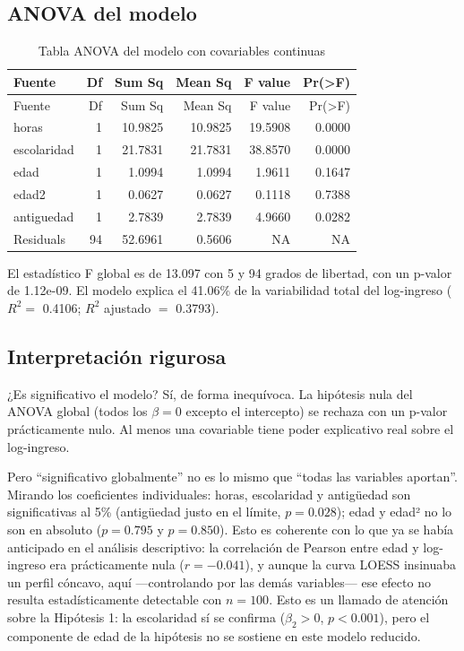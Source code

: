 \documentclass[
  spanish,
  letterpaper,
  DIV=11,
  numbers=noendperiod]{scrartcl}
\begin{document}
\subsection{ANOVA del modelo}\label{anova-del-modelo}

\begin{longtable}[]{@{}lrrrrr@{}}
\caption{Tabla ANOVA del modelo con covariables
continuas}\tabularnewline
\toprule\noalign{}
Fuente & Df & Sum Sq & Mean Sq & F value & Pr(\textgreater F) \\
\midrule\noalign{}
\endfirsthead
\toprule\noalign{}
Fuente & Df & Sum Sq & Mean Sq & F value & Pr(\textgreater F) \\
\midrule\noalign{}
\endhead
\bottomrule\noalign{}
\endlastfoot
horas & 1 & 10.9825 & 10.9825 & 19.5908 & 0.0000 \\
escolaridad & 1 & 21.7831 & 21.7831 & 38.8570 & 0.0000 \\
edad & 1 & 1.0994 & 1.0994 & 1.9611 & 0.1647 \\
edad2 & 1 & 0.0627 & 0.0627 & 0.1118 & 0.7388 \\
antiguedad & 1 & 2.7839 & 2.7839 & 4.9660 & 0.0282 \\
Residuals & 94 & 52.6961 & 0.5606 & NA & NA \\
\end{longtable}

El estadístico F global es de 13.097 con 5 y 94 grados de libertad, con
un p-valor de 1.12e-09. El modelo explica el 41.06\% de la variabilidad
total del log-ingreso (\(R^2=\) 0.4106; \(R^2\) ajustado \(=\) 0.3793).

\subsection{Interpretación rigurosa}\label{interpretaciuxf3n-rigurosa}

¿Es significativo el modelo? Sí, de forma inequívoca. La hipótesis nula
del ANOVA global (todos los \(\beta=0\) excepto el intercepto) se
rechaza con un p-valor prácticamente nulo. Al menos una covariable tiene
poder explicativo real sobre el log-ingreso.

Pero ``significativo globalmente'' no es lo mismo que ``todas las
variables aportan''. Mirando los coeficientes individuales: horas,
escolaridad y antigüedad son significativas al 5\% (antigüedad justo en
el límite, \(p=0.028\)); edad y edad² no lo son en absoluto (\(p=0.795\)
y \(p=0.850\)). Esto es coherente con lo que ya se había anticipado en
el análisis descriptivo: la correlación de Pearson entre edad y
log-ingreso era prácticamente nula (\(r=-0.041\)), y aunque la curva
LOESS insinuaba un perfil cóncavo, aquí ---controlando por las demás
variables--- ese efecto no resulta estadísticamente detectable con
\(n=100\). Esto es un llamado de atención sobre la Hipótesis 1: la
escolaridad sí se confirma (\(\beta_2>0\), \(p<0.001\)), pero el
componente de edad de la hipótesis no se sostiene en este modelo
reducido.
\end{document}
